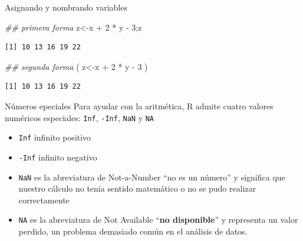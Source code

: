 \documentclass[
  ignorenonframetext,
  aspectratio=169,
  spanish,
]{beamer}
\newenvironment{Shaded}{\begin{snugshade}}{\end{snugshade}}
\newcommand{\DecValTok}[1]{\textcolor[rgb]{0.68,0.00,0.00}{#1}}
\newcommand{\DocumentationTok}[1]{\textcolor[rgb]{0.37,0.37,0.37}{\textit{#1}}}
\newcommand{\NormalTok}[1]{\textcolor[rgb]{0.00,0.23,0.31}{#1}}
\newcommand{\OtherTok}[1]{\textcolor[rgb]{0.00,0.23,0.31}{#1}}
\newcommand{\SpecialCharTok}[1]{\textcolor[rgb]{0.37,0.37,0.37}{#1}}
\begin{document}
\begin{frame}[fragile]{Asignando y nombrando variables}
\label{asignando-y-nombrando-variables-6}
\begin{Shaded}
\begin{Highlighting}[]
\DocumentationTok{\#\# primera forma }
\NormalTok{z}\OtherTok{\textless{}{-}}\NormalTok{x }\SpecialCharTok{+} \DecValTok{2} \SpecialCharTok{*}\NormalTok{ y }\SpecialCharTok{{-}} \DecValTok{3}\NormalTok{;z}
\end{Highlighting}
\end{Shaded}

\begin{verbatim}
[1] 10 13 16 19 22
\end{verbatim}

\begin{Shaded}
\begin{Highlighting}[]
\DocumentationTok{\#\# segunda forma }
\NormalTok{( z}\OtherTok{\textless{}{-}}\NormalTok{x }\SpecialCharTok{+} \DecValTok{2} \SpecialCharTok{*}\NormalTok{ y }\SpecialCharTok{{-}} \DecValTok{3}\NormalTok{ )}
\end{Highlighting}
\end{Shaded}

\begin{verbatim}
[1] 10 13 16 19 22
\end{verbatim}
\end{frame}

\begin{frame}[fragile]{Números epeciales}
\label{nuxfameros-epeciales}
Para ayudar con la aritmética, R admite cuatro valores numéricos
especiales: \texttt{Inf}, \texttt{-Inf}, \texttt{NaN} y \texttt{NA}

\begin{itemize}
\item
  \texttt{Inf} infinito positivo
\item
  \texttt{-Inf} infinito negativo
\item
  \texttt{NaN} es la abreviatura de {Not-a-Number} ``no es un número'' y
  significa que nuestro cálculo no tenía sentido matemático o no se pudo
  realizar correctamente
\item
  \texttt{NA} es la abreviatura de {Not Available} ``\textbf{no
  disponible}'' y representa un valor perdido, un problema demasiado
  común en el análisis de datos.
\end{itemize}
\end{frame}
\end{document}
